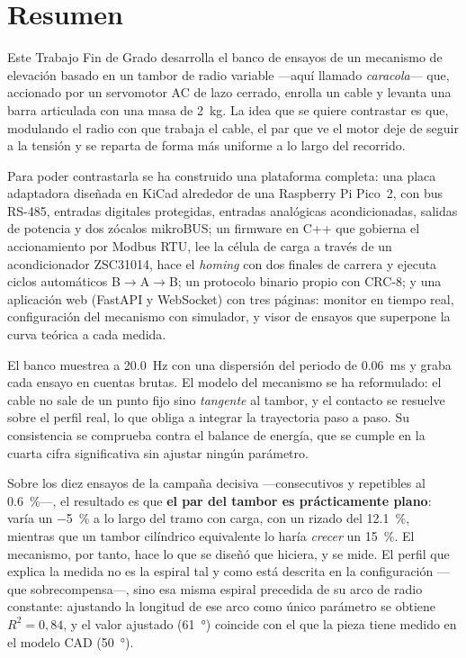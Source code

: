\chapter{Resumen}

Este Trabajo Fin de Grado desarrolla el banco de ensayos de un mecanismo de elevación basado en un
tambor de radio variable ---aquí llamado \emph{caracola}--- que, accionado por un servomotor AC de
lazo cerrado, enrolla un cable y levanta una barra articulada con una masa de \SI{2}{\kilo\gram}. La
idea que se quiere contrastar es que, modulando el radio con que trabaja el cable, el par que ve el
motor deje de seguir a la tensión y se reparta de forma más uniforme a lo largo del recorrido.

Para poder contrastarla se ha construido una plataforma completa: una placa adaptadora diseñada en
KiCad alrededor de una Raspberry Pi Pico~2, con bus RS-485, entradas digitales protegidas, entradas
analógicas acondicionadas, salidas de potencia y dos zócalos mikroBUS; un firmware en C++ que
gobierna el accionamiento por Modbus RTU, lee la célula de carga a través de un acondicionador
ZSC31014, hace el \emph{homing} con dos finales de carrera y ejecuta ciclos automáticos
B$\rightarrow$A$\rightarrow$B; un protocolo binario propio con CRC-8; y una aplicación web (FastAPI
y WebSocket) con tres páginas: monitor en tiempo real, configuración del mecanismo con simulador, y
visor de ensayos que superpone la curva teórica a cada medida.

El banco muestrea a \SI{20.0}{\hertz} con una dispersión del periodo de \SI{0.06}{\milli\second} y
graba cada ensayo en cuentas brutas. El modelo del mecanismo se ha reformulado: el cable no sale de
un punto fijo sino \emph{tangente} al tambor, y el contacto se resuelve sobre el perfil real, lo que
obliga a integrar la trayectoria paso a paso. Su consistencia se comprueba contra el balance de
energía, que se cumple en la cuarta cifra significativa sin ajustar ningún parámetro.

Sobre los diez ensayos de la campaña decisiva ---consecutivos y repetibles al \SI{0.6}{\percent}---,
el resultado es que \textbf{el par del tambor es prácticamente plano}: varía un \SI{-5}{\percent} a
lo largo del tramo con carga, con un rizado del \SI{12.1}{\percent}, mientras que un tambor cilíndrico equivalente lo haría \emph{crecer} un
\SI{15}{\percent}. El mecanismo, por tanto, hace lo que se diseñó que hiciera, y se mide. El perfil
que explica la medida no es la espiral tal y como está descrita en la configuración ---que
sobrecompensa---, sino esa misma espiral precedida de su arco de radio constante: ajustando la
longitud de ese arco como único parámetro se obtiene $R^2 = 0{,}84$, y el valor ajustado
(\SI{61}{\degree}) coincide con el que la pieza tiene medido en el modelo CAD (\SI{50}{\degree}).

